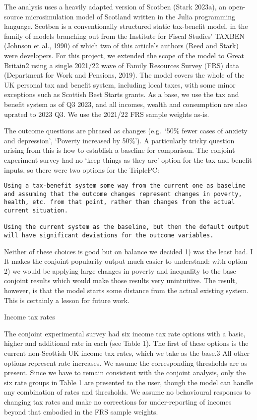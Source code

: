 \documentclass[
  letterpaper,
  DIV=11,
  numbers=noendperiod]{scrartcl}
\begin{document}
The analysis uses a heavily adapted version of Scotben (Stark 2023a), an
open-source microsimulation model of Scotland written in the Julia
programming language. Scotben is a conventionally structured static
tax-benefit model, in the family of models branching out from the
Institute for Fiscal Studies' TAXBEN (Johnson et al., 1990) of which two
of this article's authors (Reed and Stark) were developers. For this
project, we extended the scope of the model to Great Britain2 using a
single 2021/22 wave of Family Resources Survey (FRS) data (Department
for Work and Pensions, 2019). The model covers the whole of the UK
personal tax and benefit system, including local taxes, with some minor
exceptions such as Scottish Best Starts grants. As a base, we use the
tax and benefit system as of Q3 2023, and all incomes, wealth and
consumption are also uprated to 2023 Q3. We use the 2021/22 FRS sample
weights as-is.

The outcome questions are phrased as changes (e.g.~`50\% fewer cases of
anxiety and depression', `Poverty increased by 50\%'). A particularly
tricky question arising from this is how to establish a baseline for
comparison. The conjoint experiment survey had no `keep things as they
are' option for the tax and benefit inputs, so there were two options
for the TriplePC:

\begin{verbatim}
Using a tax-benefit system some way from the current one as baseline and assuming that the outcome changes represent changes in poverty, health, etc. from that point, rather than changes from the actual current situation. 

Using the current system as the baseline, but then the default output will have significant deviations for the outcome variables. 
\end{verbatim}

Neither of these choices is good but on balance we decided 1) was the
least bad. I It makes the conjoint popularity output much easier to
understand: with option 2) we would be applying large changes in poverty
and inequality to the base conjoint results which would make those
results very unintuitive. The result, however, is that the model starts
some distance from the actual existing system. This is certainly a
lesson for future work.

Income tax rates

The conjoint experimental survey had six income tax rate options with a
basic, higher and additional rate in each (see Table 1). The first of
these options is the current non-Scottish UK income tax rates, which we
take as the base.3 All other options represent rate increases. We assume
the corresponding thresholds are as present. Since we have to remain
consistent with the conjoint analysis, only the six rate groups in Table
1 are presented to the user, though the model can handle any combination
of rates and thresholds. We assume no behavioural responses to changing
tax rates and make no corrections for under-reporting of incomes beyond
that embodied in the FRS sample weights.
\end{document}
